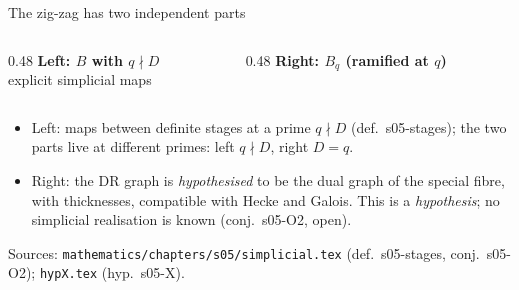 \begin{frame}{The zig-zag has two independent parts}
  \footnotesize
  \begin{columns}[T]
  \begin{column}{0.48\textwidth}
  \centering
  {\bfseries Left: $B$ with $q\nmid D$}\\[1mm]
  explicit simplicial maps
  \end{column}
  \begin{column}{0.48\textwidth}
  \centering
  {\bfseries Right: $B_q$ (ramified at $q$)}\\[1mm]
  \end{column}
  \end{columns}
  \vspace{2mm}
  \begin{itemize}
    \item Left: maps between definite stages at a prime $q\nmid D$ (def.\ s05-stages); the two parts live at different primes: left $q\nmid D$, right $D=q$.
    \item Right: the DR graph is \emph{hypothesised} to be the dual graph of the special fibre, with thicknesses, compatible with Hecke and Galois. This is a \emph{hypothesis}; no simplicial realisation is known (conj.\ s05-O2, open).
  \end{itemize}
  \vfill
  {\tiny Sources: \texttt{mathematics/chapters/s05/simplicial.tex} (def.\ s05-stages, conj.\ s05-O2); \texttt{hypX.tex} (hyp.\ s05-X).}
\end{frame}
